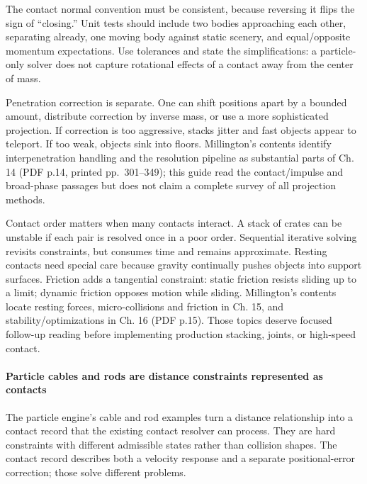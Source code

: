 The contact normal convention must be consistent, because reversing it flips the sign of ``closing.'' Unit tests should include two bodies approaching each other, separating already, one moving body against static scenery, and equal/opposite momentum expectations. Use tolerances and state the simplifications: a particle-only solver does not capture rotational effects of a contact away from the center of mass.

Penetration correction is separate. One can shift positions apart by a bounded amount, distribute correction by inverse mass, or use a more sophisticated projection. If correction is too aggressive, stacks jitter and fast objects appear to teleport. If too weak, objects sink into floors. Millington's contents identify interpenetration handling and the resolution pipeline as substantial parts of Ch. 14 (PDF p.14, printed pp.~301--349); this guide read the contact/impulse and broad-phase passages but does not claim a complete survey of all projection methods.

Contact order matters when many contacts interact. A stack of crates can be unstable if each pair is resolved once in a poor order. Sequential iterative solving revisits constraints, but consumes time and remains approximate. Resting contacts need special care because gravity continually pushes objects into support surfaces. Friction adds a tangential constraint: static friction resists sliding up to a limit; dynamic friction opposes motion while sliding. Millington's contents locate resting forces, micro-collisions and friction in Ch. 15, and stability/optimizations in Ch. 16 (PDF p.15). Those topics deserve focused follow-up reading before implementing production stacking, joints, or high-speed contact.

\paragraph{Particle cables and rods are distance constraints represented as contacts}\label{06-engine-ii-ch033-particle-cables-and-rods-are-distance-constraints-represented-as-contacts}

\hypertarget{06-engine-ii-ch033-particle-cables-and-rods-are-distance-constraints-represented-as-contacts}{}

The particle engine's cable and rod examples turn a distance relationship into a contact record that the existing contact resolver can process. They are hard constraints with different admissible states rather than collision shapes. The contact record describes both a velocity response and a separate positional-error correction; those solve different problems.

